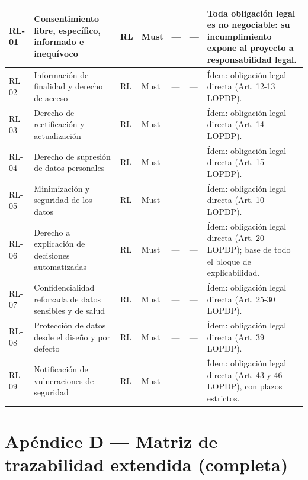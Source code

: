 \documentclass[journal,onecolumn]{IEEEtran}
\begin{document}
\begin{landscape}
\begin{longtable}{@{}p{1.2cm} p{5.2cm} p{1.0cm} p{1.3cm} p{1.3cm} p{1.1cm} p{6.5cm}@{}}
			RL-01 & Consentimiento libre, específico, informado e inequívoco & RL & Must & --- & --- & Toda obligación legal es no negociable: su incumplimiento expone al proyecto a responsabilidad legal. \\ \midrule
			RL-02 & Información de finalidad y derecho de acceso & RL & Must & --- & --- & Ídem: obligación legal directa (Art. 12-13 LOPDP). \\ \midrule
			RL-03 & Derecho de rectificación y actualización & RL & Must & --- & --- & Ídem: obligación legal directa (Art. 14 LOPDP). \\ \midrule
			RL-04 & Derecho de supresión de datos personales & RL & Must & --- & --- & Ídem: obligación legal directa (Art. 15 LOPDP). \\ \midrule
			RL-05 & Minimización y seguridad de los datos & RL & Must & --- & --- & Ídem: obligación legal directa (Art. 10 LOPDP). \\ \midrule
			RL-06 & Derecho a explicación de decisiones automatizadas & RL & Must & --- & --- & Ídem: obligación legal directa (Art. 20 LOPDP); base de todo el bloque de explicabilidad. \\ \midrule
			RL-07 & Confidencialidad reforzada de datos sensibles y de salud & RL & Must & --- & --- & Ídem: obligación legal directa (Art. 25-30 LOPDP). \\ \midrule
			RL-08 & Protección de datos desde el diseño y por defecto & RL & Must & --- & --- & Ídem: obligación legal directa (Art. 39 LOPDP). \\ \midrule
			RL-09 & Notificación de vulneraciones de seguridad & RL & Must & --- & --- & Ídem: obligación legal directa (Art. 43 y 46 LOPDP), con plazos estrictos. \\
		\end{longtable}
	\end{landscape}
	
	\section*{Apéndice D --- Matriz de trazabilidad extendida (completa)}
	\label{ap:trazabilidad}
	
\end{document}
